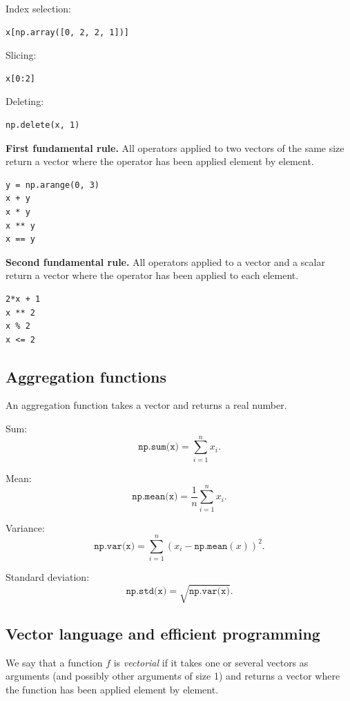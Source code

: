 \documentclass[11pt]{article}
\begin{document}
Index selection:

\begin{lstlisting}
x[np.array([0, 2, 2, 1])]
\end{lstlisting}

Slicing:

\begin{lstlisting}
x[0:2]
\end{lstlisting}

Deleting:

\begin{lstlisting}
np.delete(x, 1)
\end{lstlisting}

\medskip
\textbf{First fundamental rule.}  
All operators applied to two vectors of the same size return a vector where the operator has been applied element by element.

\begin{lstlisting}
y = np.arange(0, 3)
x + y
x * y
x ** y
x == y
\end{lstlisting}

\medskip
\textbf{Second fundamental rule.}  
All operators applied to a vector and a scalar return a vector where the operator has been applied to each element.

\begin{lstlisting}
2*x + 1
x ** 2
x % 2
x <= 2
\end{lstlisting}

\subsection{Aggregation functions}

An aggregation function takes a vector and returns a real number.

\medskip
Sum:
\[
\texttt{np.sum(x)} = \sum_{i=1}^{n} x_i .
\]

Mean:
\[
\texttt{np.mean(x)} = \frac{1}{n} \sum_{i=1}^{n} x_i .
\]

Variance:
\[
\texttt{np.var(x)} = \sum_{i=1}^{n} \left(x_i - \texttt{np.mean}(x)\right)^2 .
\]

Standard deviation:
\[
\texttt{np.std(x)} = \sqrt{\texttt{np.var(x)}} .
\]

\subsection{Vector language and efficient programming}

We say that a function $f$ is \emph{vectorial} if it takes one or several vectors as arguments (and possibly other arguments of size 1) and returns a vector where the function has been applied element by element.
\end{document}
